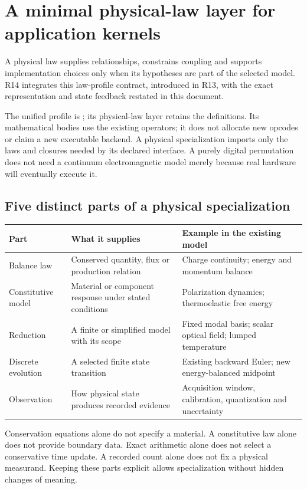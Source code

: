 \section{A minimal physical-law layer for application kernels}
\label{sec:r13-core}
A physical law supplies relationships, constrains coupling and supports
implementation choices only when its hypotheses are part of the selected
model. R14 integrates this law-profile contract, introduced in R13, with the
exact representation and state feedback restated in this document.

The unified profile is ; its physical-law layer
retains the  definitions. Its mathematical bodies use the
existing  operators; it does not allocate new opcodes or claim a
new executable backend. A physical specialization imports only the laws and
closures needed by its declared interface. A purely digital permutation does
not need a continuum electromagnetic model merely because real hardware will
eventually execute it.

\subsection{Five distinct parts of a physical specialization}
\begin{center}\small
\begin{tabularx}{\linewidth}{@{}P{30mm}Y Y@{}}
\toprule Part & What it supplies & Example in the existing model\\\midrule
Balance law & Conserved quantity, flux or production relation & Charge continuity; energy and momentum balance\\
Constitutive model & Material or component response under stated conditions & Polarization dynamics; thermoelastic free energy\\
Reduction & A finite or simplified model with its scope & Fixed modal basis; scalar optical field; lumped temperature\\
Discrete evolution & A selected finite state transition & Existing backward Euler; new energy-balanced midpoint\\
Observation & How physical state produces recorded evidence & Acquisition window, calibration, quantization and uncertainty\\
\bottomrule
\end{tabularx}\end{center}
Conservation equations alone do not specify a material. A constitutive law alone
does not provide boundary data. Exact arithmetic alone does not select a
conservative time update. A recorded count alone does not fix a physical
measurand. Keeping these parts explicit allows specialization without hidden
changes of meaning.

